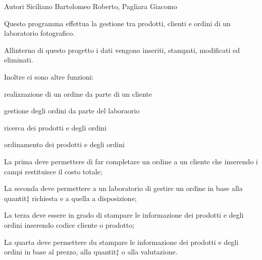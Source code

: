 \begin{DoxyAuthor}{Autori}
Siciliano Bartolomeo Roberto, Pagliara Giacomo
\end{DoxyAuthor}
Questo programma effettua la gestione tra prodotti, clienti e ordini di un laboratorio fotografico.

All\textquotesingle{}interno di questo progetto i dati vengono inseriti, stampati, modificati ed eliminati.

Inoltre ci sono altre funzioni\+:
\begin{DoxyEnumerate}
\item realizzazione di un ordine da parte di un cliente
\item gestione degli ordini da parte del laboraorio
\item ricerca dei prodotti e degli ordini
\item ordinamento dei prodotti e degli ordini
\end{DoxyEnumerate}

La prima deve permettere di far completare un ordine a un cliente che inserendo i campi restituisce il costo totale;

La seconda deve permettere a un laboratorio di gestire un ordine in base alla quantit‡ richiesta e a quella a disposizione;

La terza deve essere in grado di stampare le informazione dei prodotti e degli ordini inserendo codice cliente o prodotto;

La quarta deve permettere du stampare le informazione dei prodotti e degli ordini in base al prezzo, alla quantit‡ o alla valutazione. 